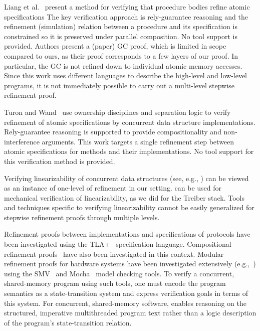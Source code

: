 Liang et al.~\cite{LiangRGSim} present a method for verifying that procedure
bodies refine atomic specifications
The key verification approach is
rely-guarantee reasoning and the refinement (simulation) relation between
a procedure and its specification is constrained so it is preserved under
parallel composition. 
No tool support is provided. 
Authors present a (paper) GC proof, which is limited in scope compared
to ours, as their proof corresponds to a few layers of our proof. In particular,
the GC is not refined down to individual atomic memory accesses. 
Since this work uses different languages to describe the high-level
and low-level programs, it is not immediately possible to carry out a
multi-level stepwise refinement proof. 

Turon and Wand~\cite{TuronM11} use ownership disciplines and
separation logic to verify refinement of atomic specifications by 
concurrent data structure implementations. 
Rely-guarantee reasoning is
supported to provide compositionality and non-interference
arguments. 
This work targets a single refinement step between atomic
specifications for methods and their implementations. 
No tool support for this verification method is provided. 

Verifying linearizability of concurrent data structures (see, e.g.,
\cite{tacasLin,aliLin}) can be viewed as an instance of one-level of
refinement in our setting. 
\civl can be used for mechanical
verification of linearizability, as we did for the Treiber stack. 
Tools and techniques specific to verifying linearizability
cannot be easily generalized for stepwise refinement proofs
through multiple levels. 

Refinement proofs
between implementations and specifications of protocols have been
investigated using the TLA+~\cite{Lamport2004} specification
language. 
Compositional refinement proofs~\cite{AbadiAssumeGuarantee} have
also been investigated in this context. 
Modular refinement proofs for hardware systems have been investigated extensively
(e.g.,~\cite{Henzinger1999,Eiriksson2000}) using the SMV~\cite{McMillan00} and Mocha~\cite{AlurHMQRT98} 
model checking tools.
To verify a concurrent, shared-memory program using such tools, one must encode
the program semantics as a state-transition system and express
verification goals in terms of this system. 
For concurrent, shared-memory
software, \civl enables reasoning on the structured, imperative
multithreaded program text rather than a logic description of the
program's state-transition relation. 
 

